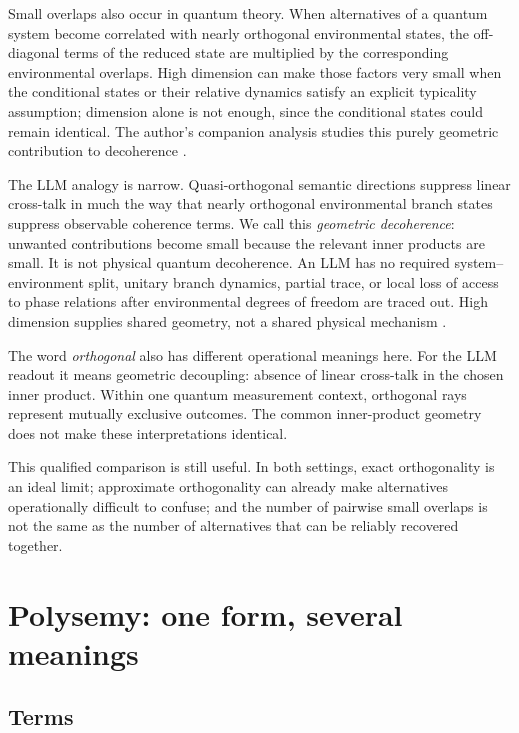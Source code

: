 \documentclass[
  aps,
  reprint,
  superscriptaddress,
  floatfix,
  nofootinbib,
  longbibliography
]{revtex4-2}
\begin{document}
Small overlaps also occur in quantum theory.  When alternatives of a quantum
system become correlated with nearly orthogonal environmental states, the
off-diagonal terms of the reduced state are multiplied by the corresponding
environmental overlaps.  High dimension can make those factors very small
when the conditional states or their relative dynamics satisfy an explicit
typicality assumption; dimension alone is not enough, since the conditional
states could remain identical.  The author's companion analysis studies this
purely geometric contribution to decoherence
\cite{svozil2026geometricdecoherence}.

The LLM analogy is narrow.  Quasi-orthogonal semantic directions suppress
linear cross-talk in much the way that nearly orthogonal environmental branch
states suppress observable coherence terms.  We call this \emph{geometric
decoherence}: unwanted contributions become small because the relevant inner
products are small.  It is not physical quantum decoherence.  An LLM has no
required system--environment split, unitary branch dynamics, partial trace,
or local loss of access to phase relations after environmental degrees of
freedom are traced out.  High dimension supplies shared geometry, not a
shared physical mechanism
\cite{RevModPhys.75.715}.

The word \emph{orthogonal} also has different operational meanings here.  For
the LLM readout it means geometric decoupling: absence of linear cross-talk in
the chosen inner product.  Within one quantum measurement
context, orthogonal rays represent
mutually exclusive outcomes.  The common inner-product geometry does not make
these interpretations identical.

This qualified comparison is still useful.  In both settings, exact
orthogonality is an ideal limit; approximate orthogonality can already make
alternatives operationally difficult to confuse; and the number of pairwise
small overlaps is not the same as the number of alternatives that can be
reliably recovered together.

\section{Polysemy: one form, several meanings}
\label{sec:polysemy}

\subsection{Terms}
\end{document}
